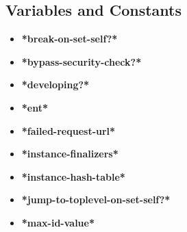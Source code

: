 \documentclass [11pt]{book}
\begin{document}
\subsection{Variables and Constants}

\label{subsec:variablesandconstants}



\begin{itemize}

\item {}
\label{prim:*break-on-set-self?*}
\textbf{*break-on-set-self?*}





\item {}
\label{prim:*bypass-security-check?*}
\textbf{*bypass-security-check?*}





\item {}
\label{prim:*developing?*}
\textbf{*developing?*}





\item {}
\label{prim:*ent*}
\textbf{*ent*}





\item {}
\label{prim:*failed-request-url*}
\textbf{*failed-request-url*}





\item {}
\label{prim:*instance-finalizers*}
\textbf{*instance-finalizers*}





\item {}
\label{prim:*instance-hash-table*}
\textbf{*instance-hash-table*}





\item {}
\label{prim:*jump-to-toplevel-on-set-self?*}
\textbf{*jump-to-toplevel-on-set-self?*}





\item {}
\label{prim:*max-id-value*}
\textbf{*max-id-value*}






\end{itemize}
\end{document}
